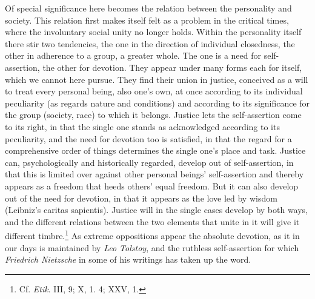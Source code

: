 \documentclass[12pt,a4paper]{book}
\newcommand{\opage}[1]{\marginnote{\footnotesize\textit{[#1]}}}
\begin{document}
Of special significance here becomes the relation between the personality and society. This relation first makes
itself felt as a problem in the critical times, where the involuntary social unity no longer holds. Within the
personality itself there stir two tendencies, the one in the direction of individual closedness, the other in
adherence to a group, a greater whole. The one is a need for self-assertion, the other for devotion. They appear
under many forms each for itself, which we cannot here pursue. They find their union in justice, conceived as a
will to treat every personal being, also one's own, at once according to its individual peculiarity (as regards
nature and conditions) and according to its significance for the group (society, race) to which it belongs. Justice
lets the self-assertion come to its right, in that the single one stands as acknowledged according to its
peculiarity, and the need for devotion too is satisfied, in that the \opage{366}regard for a comprehensive order of things
determines the single one's place and task. Justice can, psychologically and historically regarded, develop out of
self-assertion, in that this is limited over against other personal beings' self-assertion and thereby appears as a
freedom that heeds others' equal freedom. But it can also develop out of the need for devotion, in that it appears
as the love led by wisdom (Leibniz's caritas sapientis). Justice will in the single cases develop by both ways, and
the different relations between the two elements that unite in it will give it different timbre.\footnote{Cf.
\emph{Etik}. III, 9; X, 1. 4; XXV, 1.} As extreme oppositions appear the absolute devotion, as it in our days is
maintained by \emph{Leo Tolstoy}, and the ruthless self-assertion for which \emph{Friedrich Nietzsche} in some of
his writings has taken up the word.
\end{document}
